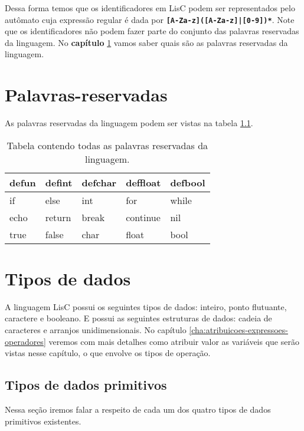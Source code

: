 \documentclass[
  12pt,				%
  oneside,			%
  a4paper,			%
  english,			%
  french,				%
  spanish,			%
  brazil,				%
]{abntex2}
\begin{document}
Dessa forma temos que os identificadores em LisC podem ser representados pelo
autômato cuja expressão regular é dada por
\textbf{\lstinline[]{[A-Za-z]([A-Za-z]|[0-9])*}}. Note que os
identificadores não podem fazer parte do conjunto das palavras
reservadas da linguagem. No \textbf{capítulo}
\ref{cha:palavras-reservadas} vamos saber quais são as palavras
reservadas da linguagem.

\chapter{Palavras-reservadas}
\label{cha:palavras-reservadas}
As palavras reservadas da linguagem podem ser vistas na tabela
\ref{tab:palavras-reservadas}.

\begin{table}[H]
  \centering
  \caption{Tabela contendo todas as palavras reservadas da linguagem.}
  \label{tab:palavras-reservadas}
  \begin{tabular}{|l|l|l|l|l|}
    \hline
    defun & defint & defchar & deffloat & defbool \\ \hline
    if&  else& int &  for& while \\ \hline
    echo&  return&  break&  continue& nil \\ \hline
    true&  false& char& float & bool\\ \hline
  \end{tabular}
\end{table}

\chapter{Tipos de dados}
\label{cha:tipos-de-dados}

A linguagem LisC possui os seguintes tipos de dados: inteiro, ponto
flutuante, caractere e booleano. E possui as seguintes estruturas de
dados: cadeia de caracteres e arranjos unidimensionais. No capítulo
\ref{cha:atribuicoes-expressoes-operadores} veremos com mais detalhes
como atribuir valor as variáveis que serão vistas nesse capítulo, o
que envolve os tipos de operação.

\section{Tipos de dados primitivos}
\label{sec:tipos-de-dados-primitivos}

Nessa seção iremos falar a respeito de cada um dos quatro tipos de
dados primitivos existentes.
\end{document}
